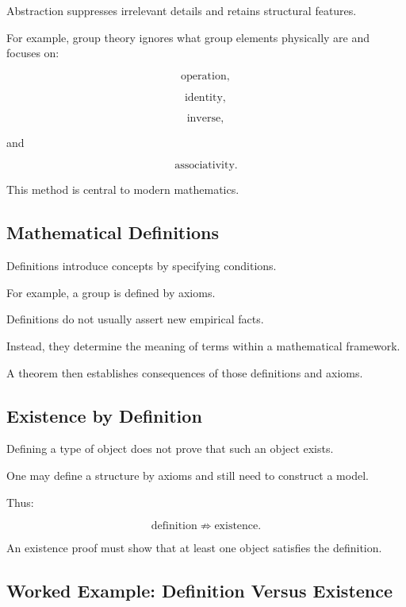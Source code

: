 Abstraction suppresses irrelevant details and retains structural features.

For example, group theory ignores what group elements physically are and
focuses on:

\[
\boxed{
\text{operation},
}
\]

\[
\boxed{
\text{identity},
}
\]

\[
\boxed{
\text{inverse},
}
\]

and

\[
\boxed{
\text{associativity}.
}
\]

This method is central to modern mathematics.

\subsection{Mathematical Definitions}
\label{subsec:philosophy-definitions}

Definitions introduce concepts by specifying conditions.

For example, a group is defined by axioms.

Definitions do not usually assert new empirical facts.

Instead, they determine the meaning of terms within a mathematical
framework.

A theorem then establishes consequences of those definitions and axioms.

\subsection{Existence by Definition}
\label{subsec:existence-by-definition}

Defining a type of object does not prove that such an object exists.

One may define a structure by axioms and still need to construct a model.

Thus:

\[
\boxed{
\text{definition}
\not\Rightarrow
\text{existence}.
}
\]

An existence proof must show that at least one object satisfies the
definition.

\subsection{Worked Example: Definition Versus Existence}
\label{subsec:worked-definition-existence}

